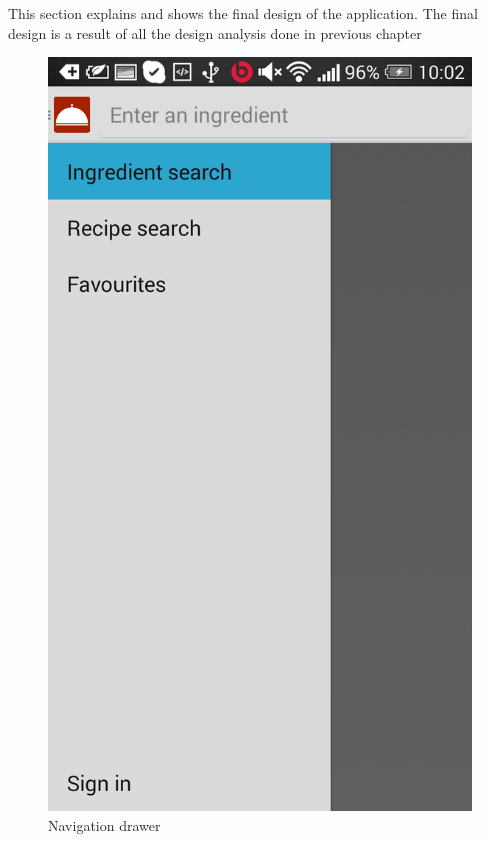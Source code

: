 This section explains and shows the final design of the application. The final design is a result of all the design analysis done in previous chapter 

\begin{figure}[H]
\begin{minipage}[t]{0.5\columnwidth}
\centering
\includegraphics[width=0.7\columnwidth]{img/screenshots/finaldrawer.png}
\caption{Navigation drawer\label{fig:navdrawer1}}
\end{minipage}
\hspace{0.5cm}
\begin{minipage}[t]{0.5\columnwidth}
\centering

\end{minipage}
\end{figure}
